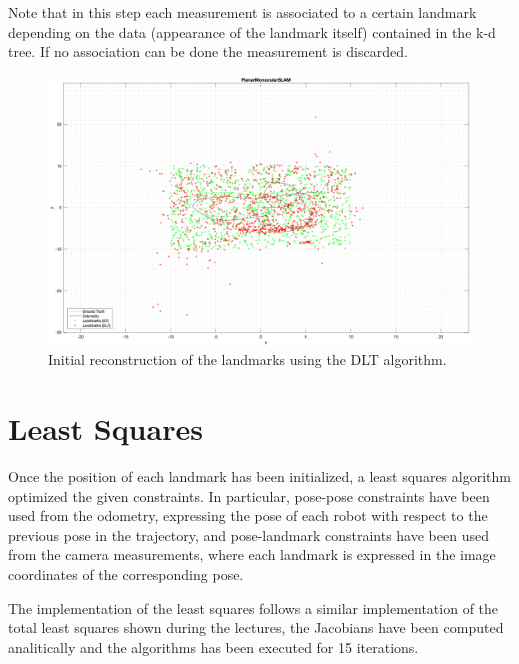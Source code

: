 \documentclass[11pt]{extarticle}
\begin{document}
Note that in this step each measurement
is associated to a certain landmark depending on the data (appearance of the
landmark itself) contained in the k-d tree. If no association can be done
the measurement is discarded.
\begin{figure}
    \centering
    \includegraphics[width=\textwidth]{images/dlt-init.png}
    \caption{Initial reconstruction of the landmarks using the DLT algorithm.}
    \label{fig:dlt-init}
\end{figure}

\section{Least Squares}
Once the position of each landmark has been initialized, a least squares
algorithm optimized the given constraints. In particular, pose-pose constraints
have been used from the odometry, expressing the pose of each robot with
respect to the previous pose in the trajectory, and pose-landmark constraints
have been used from the camera measurements, where each landmark is expressed
in the image coordinates of the corresponding pose.

The implementation of the least squares follows a similar implementation of the
total least squares shown during the lectures, the Jacobians have been computed
analitically and the algorithms has been executed for 15 iterations.


\end{document}
